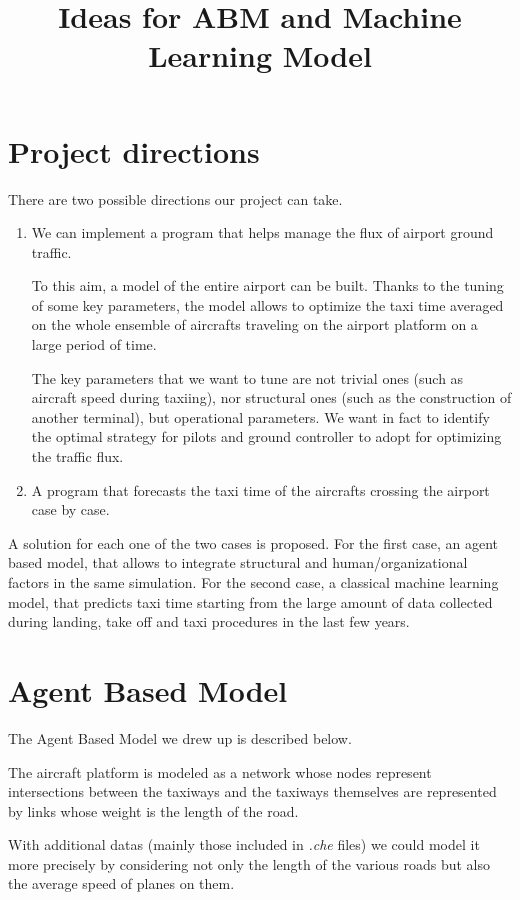 \documentclass{article}
\begin{document}
	
	\title{Ideas for ABM and Machine Learning Model}
	\maketitle
	
\section*{Project directions}
There are two possible directions our project can take.
\begin{enumerate}
	\item We can implement a program that helps manage the flux of airport ground traffic.
	
	 To this aim, a model of the entire airport can be built. Thanks to the tuning of some key parameters, the model allows to optimize the taxi time averaged on the whole ensemble of aircrafts traveling on the airport platform on a large period of time. 
	
	The key parameters that we want to tune are not trivial ones (such as aircraft speed during taxiing), nor structural ones (such as the construction of another terminal), but operational parameters. We want in fact to identify the optimal strategy for pilots and ground controller to adopt for optimizing the traffic flux.
	
	\item A program that forecasts the taxi time of the aircrafts crossing the airport case by case.
\end{enumerate}
A solution for each one of the two cases is proposed. For the first case, an agent based model, that allows to integrate structural and human/organizational factors in the same simulation. For the second case, a classical machine learning model, that predicts taxi time starting from the large amount of data collected during landing, take off and taxi procedures in the last few years.

\section{Agent Based Model}	
The Agent Based Model we drew up is described below. 

The aircraft platform is modeled as a network whose nodes represent intersections between the taxiways and the taxiways themselves are represented by links whose weight is the length of the road.

With additional datas (mainly those included in \textit{.che} files) we could model it more precisely by considering not only the length of the various roads but also the average speed of planes on them.
\end{document}
